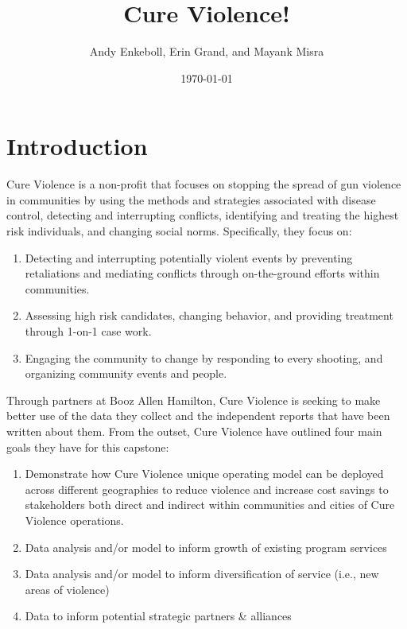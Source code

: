 \documentclass[11pt,preprint]{aastex}
\begin{document}
\title{Cure Violence!}

 \author{Andy Enkeboll, Erin Grand, and Mayank Misra}
 
\date{\today}             



\tableofcontents

\section{Introduction}
Cure Violence is a non-profit that focuses on stopping the spread of  gun violence in communities by using the methods and strategies associated with disease control, detecting and interrupting conflicts, identifying and treating the highest risk individuals, and changing social norms. Specifically, they focus on:
\begin{enumerate}
\item Detecting and interrupting potentially violent events by preventing retaliations and mediating conflicts through on-the-ground efforts within communities.
\item Assessing high risk candidates, changing behavior, and providing treatment through 1-on-1 case work.
\item Engaging the community to change by responding to every shooting, and organizing community events and people.
\end{enumerate}
Through partners at Booz Allen Hamilton, Cure Violence is seeking to make better use of the data they collect and the independent reports that have been written about them.  From the outset, Cure Violence have outlined four main goals they have for this capstone:
\begin{enumerate}
    \item Demonstrate how Cure Violence unique operating model can be deployed across different geographies to reduce violence and increase cost savings to stakeholders both direct and indirect within communities and cities of Cure Violence operations.
    \item Data analysis and/or model to inform growth of existing program services
    \item Data analysis and/or model to inform diversification of service (i.e., new areas of violence)
    \item Data to inform potential strategic partners & alliances
\end{enumerate}
\end{document}
